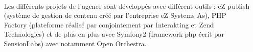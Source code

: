          \paragraph{}
        Les différents projets de l'agence sont développés avec différent outils : eZ publish (système de gestion de contenu créé par l'entreprise eZ Systems As), PHP Factory (plateforme réalisé par conjointement par Interakting et Zend Technologies) et de plus en plus avec Symfony2 (framework php écrit par SensionLabs) avec notamment Open Orchestra.

        
        
        